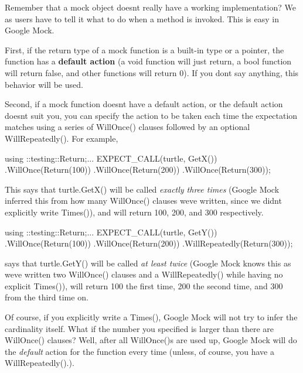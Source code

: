 Remember that a mock object doesn\textquotesingle{}t really have a working implementation? We as users have to tell it what to do when a method is invoked. This is easy in Google Mock.

First, if the return type of a mock function is a built-\/in type or a pointer, the function has a {\bfseries default action} (a {\ttfamily void} function will just return, a {\ttfamily bool} function will return {\ttfamily false}, and other functions will return 0). If you don\textquotesingle{}t say anything, this behavior will be used.

Second, if a mock function doesn\textquotesingle{}t have a default action, or the default action doesn\textquotesingle{}t suit you, you can specify the action to be taken each time the expectation matches using a series of {\ttfamily Will\+Once()} clauses followed by an optional {\ttfamily Will\+Repeatedly()}. For example,


\begin{DoxyCode}
using ::testing::Return;...
EXPECT\_CALL(turtle, GetX())
    .WillOnce(Return(100))
    .WillOnce(Return(200))
    .WillOnce(Return(300));
\end{DoxyCode}


This says that {\ttfamily turtle.\+Get\+X()} will be called {\itshape exactly three times} (Google Mock inferred this from how many {\ttfamily Will\+Once()} clauses we\textquotesingle{}ve written, since we didn\textquotesingle{}t explicitly write {\ttfamily Times()}), and will return 100, 200, and 300 respectively.


\begin{DoxyCode}
using ::testing::Return;...
EXPECT\_CALL(turtle, GetY())
    .WillOnce(Return(100))
    .WillOnce(Return(200))
    .WillRepeatedly(Return(300));
\end{DoxyCode}


says that {\ttfamily turtle.\+Get\+Y()} will be called {\itshape at least twice} (Google Mock knows this as we\textquotesingle{}ve written two {\ttfamily Will\+Once()} clauses and a {\ttfamily Will\+Repeatedly()} while having no explicit {\ttfamily Times()}), will return 100 the first time, 200 the second time, and 300 from the third time on.

Of course, if you explicitly write a {\ttfamily Times()}, Google Mock will not try to infer the cardinality itself. What if the number you specified is larger than there are {\ttfamily Will\+Once()} clauses? Well, after all {\ttfamily Will\+Once()}s are used up, Google Mock will do the {\itshape default} action for the function every time (unless, of course, you have a {\ttfamily Will\+Repeatedly()}.).

